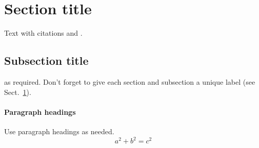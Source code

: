 \section{Section title}
\label{sec:1}
Text with citations \cite{RefB} and \cite{RefJ}.
\subsection{Subsection title}
\label{sec:2}
as required. Don't forget to give each section
and subsection a unique label (see Sect.~\ref{sec:1}).
\paragraph{Paragraph headings} Use paragraph headings as needed.
\begin{equation}
a^2+b^2=c^2
\end{equation}

